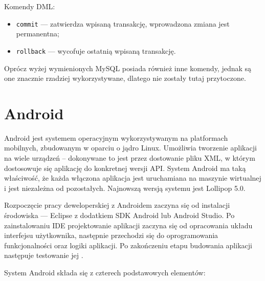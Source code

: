 \documentclass[eng,printmode,oneside]{mgr}
\begin{document}
Komendy DML:
\begin{itemize}
  \item \texttt{commit} --- zatwierdza wpisaną transakcję, wprowadzona zmiana jest
  permanentna;
  \item \texttt{rollback} --- wycofuje ostatnią wpisaną transakcję.
\end{itemize}

Oprócz wyżej wymienionych MySQL posiada również inne komendy, jednak są one
znacznie rzadziej wykorzystywane, dlatego nie zostały tutaj przytoczone.

\newpage
\section{Android}

Android jest systemem operacyjnym wykorzystywanym na platformach mobilnych,
zbudowanym w oparciu o jądro Linux. Umożliwia tworzenie aplikacji na wiele
urządzeń -- dokonywane to jest przez dostowanie pliku XML, w którym
dostosowuje się aplikację do konkretnej wersji API. System Android ma taką
właściwość, że każda włączona aplikacja jest uruchamiana na maszynie
wirtualnej i jest niezależna od pozostałych. Najnowszą wersją systemu
jest Lollipop 5.0.

Rozpoczęcie pracy deweloperskiej z Androidem zaczyna się od instalacji
środowiska --- Eclipse z dodatkiem SDK Android lub Android Studio. Po
zainstalowaniu IDE projektowanie aplikacji zaczyna się od opracowania układu
interfejsu użytkownika, następnie przechodzi się do oprogramowania
funkcjonalności oraz logiki aplikacji. Po zakończeniu etapu budowania aplikacji
następuje testowanie jej \cite{developer.android}.

System Android składa się z czterech podstawowych elementów:
\end{document}
